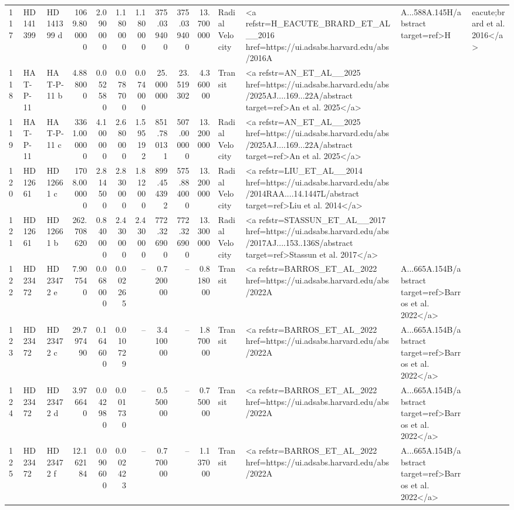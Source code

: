 \begin{tabular}{lllrrrrrrrll}
117 & HD 141399 & HD 141399 d & 1069.800000 & 2.090000 & 1.180000 & 1.180000 & 375.039400 & 375.039400 & 13.700000 & Radial Velocity & <a refstr=H_EACUTE_BRARD_ET_AL__2016 href=https://ui.adsabs.harvard.edu/abs/2016A&A...588A.145H/abstract target=ref>H&eacute;brard et al. 2016</a> \\
118 & HAT-P-11 & HAT-P-11 b & 4.888000 & 0.052580 & 0.078700 & 0.074000 & 25.000000 & 23.519302 & 4.360000 & Transit & <a refstr=AN_ET_AL__2025 href=https://ui.adsabs.harvard.edu/abs/2025AJ....169...22A/abstract target=ref>An et al. 2025</a> \\
119 & HAT-P-11 & HAT-P-11 c & 3361.000000 & 4.100000 & 2.680000 & 1.595192 & 851.780131 & 507.000000 & 13.200000 & Radial Velocity & <a refstr=AN_ET_AL__2025 href=https://ui.adsabs.harvard.edu/abs/2025AJ....169...22A/abstract target=ref>An et al. 2025</a> \\
120 & HD 12661 & HD 12661 c & 1708.000000 & 2.814500 & 2.830000 & 1.812000 & 899.454392 & 575.884000 & 13.200000 & Radial Velocity & <a refstr=LIU_ET_AL__2014 href=https://ui.adsabs.harvard.edu/abs/2014RAA....14.1447L/abstract target=ref>Liu et al. 2014</a> \\
121 & HD 12661 & HD 12661 b & 262.708620 & 0.840000 & 2.430000 & 2.430000 & 772.326900 & 772.326900 & 13.300000 & Radial Velocity & <a refstr=STASSUN_ET_AL__2017 href=https://ui.adsabs.harvard.edu/abs/2017AJ....153..136S/abstract target=ref>Stassun et al. 2017</a> \\
122 & HD 23472 & HD 23472 e & 7.907540 & 0.068000 & 0.002265 & -- & 0.720000 & -- & 0.818000 & Transit & <a refstr=BARROS_ET_AL_2022 href=https://ui.adsabs.harvard.edu/abs/2022A&A...665A.154B/abstract target=ref>Barros et al. 2022</a> \\
123 & HD 23472 & HD 23472 c & 29.797490 & 0.164600 & 0.010729 & -- & 3.410000 & -- & 1.870000 & Transit & <a refstr=BARROS_ET_AL_2022 href=https://ui.adsabs.harvard.edu/abs/2022A&A...665A.154B/abstract target=ref>Barros et al. 2022</a> \\
124 & HD 23472 & HD 23472 d & 3.976640 & 0.042980 & 0.001730 & -- & 0.550000 & -- & 0.750000 & Transit & <a refstr=BARROS_ET_AL_2022 href=https://ui.adsabs.harvard.edu/abs/2022A&A...665A.154B/abstract target=ref>Barros et al. 2022</a> \\
125 & HD 23472 & HD 23472 f & 12.162184 & 0.090600 & 0.002423 & -- & 0.770000 & -- & 1.137000 & Transit & <a refstr=BARROS_ET_AL_2022 href=https://ui.adsabs.harvard.edu/abs/2022A&A...665A.154B/abstract target=ref>Barros et al. 2022</a> \\

\end{tabular}
